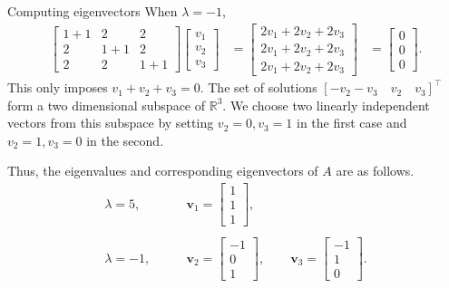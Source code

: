 \documentclass[handout]{beamer}
\def\v{\bm{v}}
\begin{document}
        \begin{frame}{Computing eigenvectors}
                When $\lambda = -1$,
                \begin{align*}
                        \begin{bmatrix}
                                1 + 1 & 2 & 2 \\ 2 & 1 + 1 & 2 \\ 2 & 2 & 1 + 1
                        \end{bmatrix}
                        \begin{bmatrix}
                                v_{1} \\ v_{2} \\ v_{3}
                        \end{bmatrix}
                        &= \begin{bmatrix}
                                2v_1 + 2v_2 + 2v_3 \\
                                2v_1 + 2v_2 + 2v_3 \\
                                2v_1 + 2v_2 + 2v_3
                        \end{bmatrix}
                        &= \begin{bmatrix}
                                0 \\ 0 \\ 0
                        \end{bmatrix}.
                \end{align*}
                This only imposes $v_1 + v_2 + v_3 = 0$. The set of solutions $[-v_2 - v_3\quad v_2\quad v_3]^\top$ form a two dimensional
                subspace of $\mathbb{R}^3$. We choose two linearly independent vectors from this subspace by setting $v_2 = 0, v_3 = 1$ in the first case
                and $v_2 = 1, v_3 = 0$ in the second.
        \end{frame}

        \begin{frame}
                Thus, the eigenvalues and corresponding eigenvectors of $A$ are as follows.
                \begin{align*}
                        \lambda = 5,  & \qquad \v_1 = \begin{bmatrix}1 \\ 1 \\ 1\end{bmatrix}, \\\\
                        \lambda = -1, & \qquad \v_2 = \begin{bmatrix}-1 \\ 0 \\ 1 \end{bmatrix}, \qquad
                                \v_3 = \begin{bmatrix}-1 \\ 1 \\ 0 \end{bmatrix}.
                \end{align*}    
        \end{frame}
\end{document}
